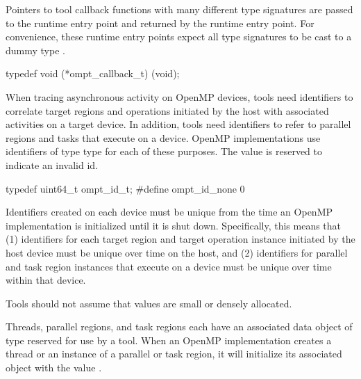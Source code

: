 \label{sec:ompt_callback_t}

Pointers to tool callback functions with many different type
signatures are passed to the  runtime entry point and
returned by the  runtime entry point. For convenience,
these runtime entry points expect all type signatures to be cast to
a dummy type .


\begin{ccppspecific}
\begin{omptCallback}
typedef void (*ompt_callback_t) (void);
\end{omptCallback}
\end{ccppspecific}



\label{sec:ompt_id_t}
When tracing asynchronous activity on OpenMP devices, tools need identifiers to correlate target regions and operations initiated by the host with
associated activities on a target device. In addition, tools need identifiers to refer to parallel regions and tasks that execute on a device.
OpenMP implementations use identifiers of type  type for each of these purposes.
The value  is
reserved to indicate an invalid id.


\begin{ccppspecific}
\begin{omptOther}
typedef uint64_t ompt_id_t;
#define ompt_id_none 0
\end{omptOther}
\end{ccppspecific}


Identifiers created on each device must be unique from the time an OpenMP implementation is initialized until it is shut down.
Specifically, this means that (1) identifiers for each target region and target operation instance initiated by the host device must be unique over time on the host,
and (2) identifiers for parallel and task region instances that execute on a device must be unique over time within that device.

Tools should not assume that  values are small or densely allocated.


\label{sec:ompt_data_t}
Threads, parallel regions, and task regions
each have an associated data object of type  reserved for use by a tool.
When an OpenMP implementation creates a thread or an instance of a parallel or task region,
it will initialize its associated  object with the value .


